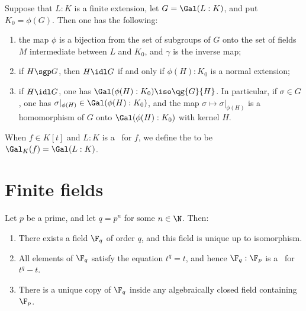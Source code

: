 \documentclass{article}
\begin{document}
  \begin{theorem}
    Suppose that $ L:K $ is a finite extension, let $ G=\Gal(L:K) $, and put $ K_0=\phi(G) $.
    Then one has the following: \begin{enumerate}[label=(\alph*)]
      \item the map $ \phi $ is a bijection from the set of subgroups of $ G $ onto the set of fields $ M $ intermediate between $ L $ and $ K_0 $, and $ \gamma $ is the inverse map;
      \item if $ H \sgp G $, then $ H\idl G $ if and only if $ \phi(H):K_0 $ is a normal extension;
      \item if $ H\idl G $, one has $ \Gal(\phi(H):K_0) \iso \qg{G}{H} $.
        In particular, if $ \sigma\in G $, one has $ \sigma|_{\phi(H)} \in \Gal(\phi(H):K_0) $, and the map $ \sigma\mapsto\sigma|_{\phi(H)} $ is a homomorphism of $ G $ onto $ \Gal(\phi(H):K_0) $ with kernel $ H $.
    \end{enumerate}
  \end{theorem}

  \begin{definition}
    When $ f\in K[t] $ and $ L:K $ is a \sfe~for $ f $, we define the  to be $ \Gal_K(f) = \Gal(L:K) $.
  \end{definition}


\section{Finite fields}
  \begin{theorem}
    Let $ p $ be a prime, and let $ q=p^n $ for some $ n\in \N $.
    Then: \begin{enumerate}[label=(\alph*)]
      \item There exists a field $ \F_q $ of order $ q $, and this field is unique up to isomorphism.
      \item All elements of $ \F_q $ satisfy the equation $ t^q=t $, and hence $ \F_q:\F_p $ is a \sfe~for $ t^q-t $.
      \item There is a unique copy of $ \F_q $ inside any algebraically closed field containing $ \F_p $.
    \end{enumerate}
  \end{theorem}
\end{document}
